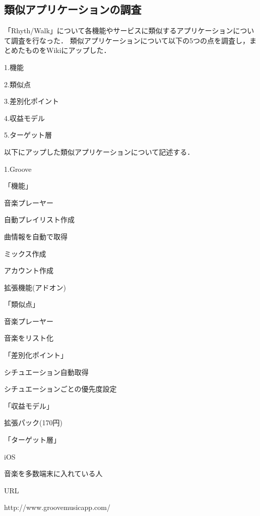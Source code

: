 \subsection{類似アプリケーションの調査}


\par 
 「Rhyth/Walk」について各機能やサービスに類似するアプリケーションについて調査を行なった．
類似アプリケーションについて以下の5つの点を調査し，まとめたものをWikiにアップした．
\par
1.機能
\par
2.類似点
\par
3.差別化ポイント
\par
4.収益モデル
\par
5.ターゲット層
\par
以下にアップした類似アプリケーションについて記述する．
\\

\par
1.Groove
\par
「機能」
\par
音楽プレーヤー
\par
自動プレイリスト作成
\par
曲情報を自動で取得
\par
ミックス作成
\par
アカウント作成
\par
拡張機能(アドオン)
\par
「類似点」
\par
音楽プレーヤー
\par
音楽をリスト化
\par
「差別化ポイント」
\par
シチュエーション自動取得
\par
シチュエーションごとの優先度設定
\par
「収益モデル」
\par
拡張パック(170円)
\par
「ターゲット層」
\par
iOS
\par
音楽を多数端末に入れている人
\par
URL
\par
http://www.groovemusicapp.com/
\\

